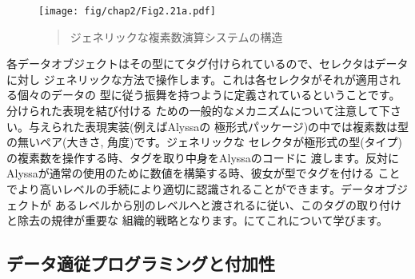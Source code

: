 \begin{figure}[tb]
\label{Figure 2.21}
\centering
\begin{comment}
\begin{quote}
\heading{Figure 2.21:} Structure of the generic complex-arithmetic system.

\begin{example}
    +-------------------------------------------------+
----| add-complex sub-complex mul-complex div-complex |----
    +-------------------------------------------------+
                Complex arithmetic package
                 +-----------------------+
                 | real-part   imag-part |
-----------------|                       |------------------
                 | magnitude   angle     |
                 +-----------+-----------+
           Rectangular       |          Polar
          representation     |     representation
-----------------------------+------------------------------
       List structure and primitive machine arithmetic
\end{example}
\end{quote}
\end{comment}
\texttt{[image: fig/chap2/Fig2.21a.pdf]}
\begin{quote}
 ジェネリックな複素数演算システムの構造
\end{quote}
\end{figure}

\noindent
各データオブジェクトはその型にてタグ付けられているので、セレクタはデータに対し
ジェネリックな方法で操作します。これは各セレクタがそれが適用される個々のデータの
型に従う振舞を持つように定義されているということです。分けられた表現を結び付ける
ための一般的なメカニズムについて注意して下さい。与えられた表現実装(例えばAlyssaの
極形式パッケージ)の中では複素数は型の無いペア(大きさ, 角度)です。ジェネリックな
セレクタが極形式の型(タイプ)の複素数を操作する時、タグを取り中身をAlyssaのコードに
渡します。反対にAlyssaが通常の使用のために数値を構築する時、彼女が型でタグを付ける
ことでより高いレベルの手続により適切に認識されることができます。データオブジェクトが
あるレベルから別のレベルへと渡されるに従い、このタグの取り付けと除去の規律が重要な
組織的戦略となります。にてこれについて学びます。


\subsection{データ適従プログラミングと付加性}
\label{Section 2.4.3}



